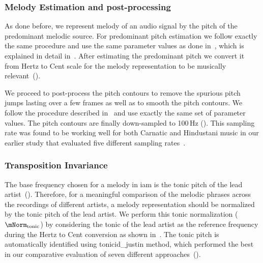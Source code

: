 \subsubsection{Melody Estimation and post-processing}
\label{sec:patterns_improving_similarity_melody_estimation}

As done before, we represent melody of an audio signal by the pitch of the predominant melodic source. For predominant pitch estimation we follow exactly the same procedure and use the same parameter values as done in~, which is explained in detail in~. After estimating the predominant pitch we convert it from Hertz to Cent scale for the melody representation to be musically relevant~().

We proceed to post-process the pitch contours to remove the spurious pitch jumps lasting over a few frames as well as to smooth the pitch contours. We follow the procedure described in~ and use exactly the same set of parameter values. The pitch contours are finally down-sampled to 100\,Hz (). This sampling rate was found to be working well for both Carnatic and Hindustani music in our earlier study that evaluated five different sampling rates~.


\subsubsection{Transposition Invariance}
\label{sec:patterns_improving_similarity_transposition_invariance}

The base frequency chosen for a melody in \gls{iam} is the tonic pitch of the lead artist~(). Therefore, for a meaningful comparison of the melodic phrases across the recordings of different artists, a melody representation should be normalized by the tonic pitch of the lead artist. We perform this tonic normalization ($\mNorm_\mathrm{tonic}$) by considering the tonic of the lead artist as the reference frequency during the Hertz to Cent conversion as shown in~. The tonic pitch is automatically identified using \acrshort{tonicid_justin} method, which performed the best in our comparative evaluation of seven different approaches~().

